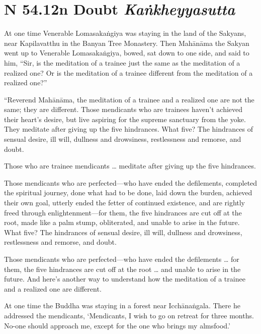 \documentclass[12pt,openany]{book}%
\newcommand*{\suttatitleacronym}[1]{\smaller[2]{#1}\vspace*{.3em}}
\newcommand*{\suttatitletranslation}[1]{\linebreak{#1}}
\newcommand*{\suttatitleroot}[1]{\linebreak\smaller[2]\itshape{#1}}
\newcommand*{\tocacronym}[1]{\hspace*{-3.3em}{#1}\quad}
\newcommand*{\toctranslation}[1]{#1}
\newcommand*{\tocroot}[1]{(\textit{#1})}
\begin{document}
%
\section*{{\suttatitleacronym SN 54.12}{\suttatitletranslation In Doubt }{\suttatitleroot Kaṅkheyyasutta}}
\addcontentsline{toc}{section}{\tocacronym{SN 54.12} \toctranslation{In Doubt } \tocroot{Kaṅkheyyasutta}}

At one time Venerable \textsanskrit{Lomasakaṅgiya} was staying in the land of the Sakyans, near Kapilavatthu in the Banyan Tree Monastery. Then \textsanskrit{Mahānāma} the Sakyan went up to Venerable \textsanskrit{Lomasakaṅgiya}, bowed, sat down to one side, and said to him, “Sir, is the meditation of a trainee just the same as the meditation of a realized one? Or is the meditation of a trainee different from the meditation of a realized one?” 

“Reverend \textsanskrit{Mahānāma}, the meditation of a trainee and a realized one are not the same; they are different. Those mendicants who are trainees haven’t achieved their heart’s desire, but live aspiring for the supreme sanctuary from the yoke. They meditate after giving up the five hindrances. What five? The hindrances of sensual desire, ill will, dullness and drowsiness, restlessness and remorse, and doubt. 

Those who are trainee mendicants … meditate after giving up the five hindrances. 

Those mendicants who are perfected—who have ended the defilements, completed the spiritual journey, done what had to be done, laid down the burden, achieved their own goal, utterly ended the fetter of continued existence, and are rightly freed through enlightenment—for them, the five hindrances are cut off at the root, made like a palm stump, obliterated, and unable to arise in the future. What five? The hindrances of sensual desire, ill will, dullness and drowsiness, restlessness and remorse, and doubt. 

Those mendicants who are perfected—who have ended the defilements … for them, the five hindrances are cut off at the root … and unable to arise in the future. And here’s another way to understand how the meditation of a trainee and a realized one are different. 

At one time the Buddha was staying in a forest near \textsanskrit{Icchānaṅgala}. There he addressed the mendicants, ‘Mendicants, I wish to go on retreat for three months. No-one should approach me, except for the one who brings my almsfood.’ 
\end{document}
